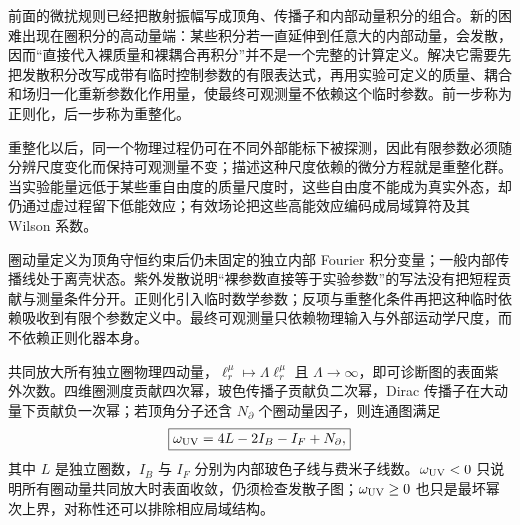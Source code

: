 \label{sec:qft-renormalization-rg-dp10}

前面的微扰规则已经把散射振幅写成顶角、传播子和内部动量积分的组合。新的困难出现在圈积分的高动量端：某些积分若一直延伸到任意大的内部动量，会发散，因而“直接代入裸质量和裸耦合再积分”并不是一个完整的计算定义。解决它需要先把发散积分改写成带有临时控制参数的有限表达式，再用实验可定义的质量、耦合和场归一化重新参数化作用量，使最终可观测量不依赖这个临时参数。前一步称为正则化，后一步称为重整化。

重整化以后，同一个物理过程仍可在不同外部能标下被探测，因此有限参数必须随分辨尺度变化而保持可观测量不变；描述这种尺度依赖的微分方程就是重整化群。当实验能量远低于某些重自由度的质量尺度时，这些自由度不能成为真实外态，却仍通过虚过程留下低能效应；有效场论把这些高能效应编码成局域算符及其 Wilson 系数。

圈动量定义为顶角守恒约束后仍未固定的独立内部 Fourier 积分变量；一般内部传播线处于离壳状态。紫外发散说明“裸参数直接等于实验参数”的写法没有把短程贡献与测量条件分开。正则化引入临时数学参数；反项与重整化条件再把这种临时依赖吸收到有限个参数定义中。最终可观测量只依赖物理输入与外部运动学尺度，而不依赖正则化器本身。


共同放大所有独立圈物理四动量，\(\ell_r^\mu\mapsto\Lambda\ell_r^\mu\) 且 \(\Lambda\to\infty\)，即可诊断图的表面紫外次数。四维圈测度贡献四次幂，玻色传播子贡献负二次幂，Dirac 传播子在大动量下贡献负一次幂；若顶角分子还含 \(N_\partial\) 个圈动量因子，则连通图满足
\begin{equation}
 \boxed{
 \omega_{\rm UV}=4L-2I_B-I_F+N_\partial,}
 \label{eq:superficial-degree-general-dp10}
\end{equation}
其中 \(L\) 是独立圈数，\(I_B\) 与 \(I_F\) 分别为内部玻色子线与费米子线数。\(\omega_{\rm UV}<0\) 只说明所有圈动量共同放大时表面收敛，仍须检查发散子图；\(\omega_{\rm UV}\ge0\) 也只是最坏幂次上界，对称性还可以排除相应局域结构。

